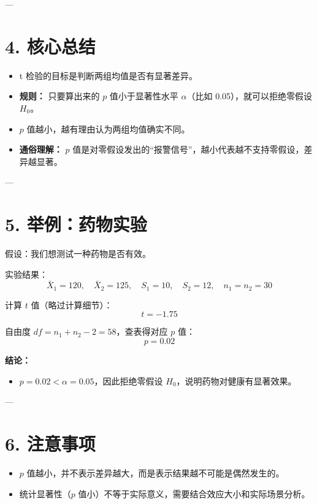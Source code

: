 \documentclass[12pt]{article}
\begin{document}
---

\section*{4. 核心总结}
\begin{itemize}
    \item t 检验的目标是判断两组均值是否有显著差异。
    \item \textbf{规则：}  
    只要算出来的 \( p \) 值小于显著性水平 \( \alpha \)（比如 0.05），就可以拒绝零假设 \( H_0 \)。
    \item \( p \) 值越小，越有理由认为两组均值确实不同。
    \item \textbf{通俗理解：}  
    \( p \) 值是对零假设发出的“报警信号”，越小代表越不支持零假设，差异越显著。
\end{itemize}

---

\section*{5. 举例：药物实验}
假设：我们想测试一种药物是否有效。
\begin{itemize}
    \item \textbf{零假设（\( H_0 \)}：}药物无效（实验组和对照组的均值相等）。
    \item \textbf{备选假设（\( H_1 \)}：}药物有效（实验组和对照组的均值不同）。
\end{itemize}

实验结果：
\[
\bar{X}_1 = 120, \quad \bar{X}_2 = 125, \quad S_1 = 10, \quad S_2 = 12, \quad n_1 = n_2 = 30
\]

计算 \( t \) 值（略过计算细节）：
\[
t = -1.75
\]

自由度 \( df = n_1 + n_2 - 2 = 58 \)，查表得对应 \( p \) 值：
\[
p = 0.02
\]

\textbf{结论：}
\begin{itemize}
    \item \( p = 0.02 < \alpha = 0.05 \)，因此拒绝零假设 \( H_0 \)，说明药物对健康有显著效果。
\end{itemize}

---

\section*{6. 注意事项}
\begin{itemize}
    \item \( p \) 值越小，并不表示差异越大，而是表示结果越不可能是偶然发生的。
    \item 统计显著性（\( p \) 值小）不等于实际意义，需要结合效应大小和实际场景分析。
\end{itemize}
\end{document}
